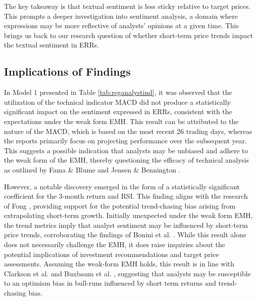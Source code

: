 
The key takeaway is that textual sentiment is less sticky relative to target prices. This prompts a deeper investigation into sentiment analysis, a domain where expressions may be more reflective of analysts' opinions at a given time. This brings us back to our research question of whether short-term price trends impact the textual sentiment in ERRs. 

\subsection{Implications of Findings}

In Model 1 presented in Table \ref{tab:reganalystind}, it was observed that the utilization of the technical indicator MACD did not produce a statistically significant impact on the sentiment expressed in ERRs, consistent with the expectations under the weak form EMH. This result can be attributed to the nature of the MACD, which is based on the most recent 26 trading days, whereas the reports primarily focus on projecting performance over the subsequent year. This suggests a possible indication that analysts may be unbiased and adhere to the weak form of the EMH, thereby questioning the efficacy of technical analysis as outlined by Fama \& Blume \parencite*{fama1966filter} and Jensen \& Bennington \parencite*{jensen1970random}.

However, a notable discovery emerged in the form of a statistically significant coefficient for the 3-month return and RSI. This finding aligns with the research of Fong \parencite*{fong2014trend}, providing support for the potential trend-chasing bias arising from extrapolating short-term growth. Initially unexpected under the weak form EMH, the trend metrics imply that analyst sentiment may be influenced by short-term price trends, corroborating the findings of Bonini et al. \parencite*{bonini2010target}. While this result alone does not necessarily challenge the EMH, it does raise inquiries about the potential implications of investment recommendations and target price assessments. Assuming the weak-form EMH holds, this result is in line with Clarkson et al. \parencite*{clarkson2015target} and Buxbaum et al. \parencite*{buxbaum2019target}, suggesting that analysts may be susceptible to an optimism bias in bull-runs influenced by short term returns and trend-chasing bias.

